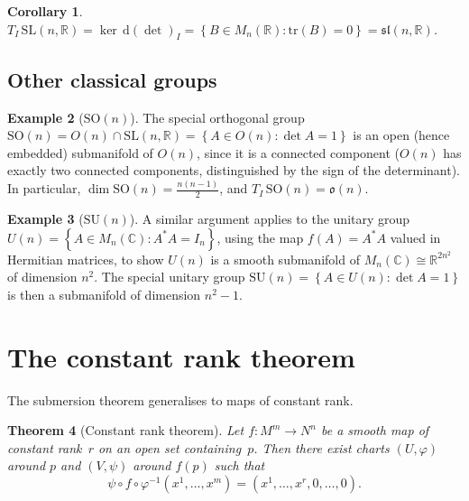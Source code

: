 \documentclass[12pt,a4paper,openany]{book}
\newtheorem{theorem}{Theorem}[section]
\newtheorem{corollary}[theorem]{Corollary}
\theoremstyle{definition}
\newtheorem{example}[theorem]{Example}
\theoremstyle{remark}
\newcommand{\R}{\mathbb{R}}
\newcommand{\C}{\mathbb{C}}
\newcommand{\SL}{\mathrm{SL}}
\newcommand{\SO}{\mathrm{SO}}
\newcommand{\SU}{\mathrm{SU}}
\newcommand{\dd}{\,\mathrm{d}}
\newcommand{\set}[1]{\left\{ #1 \right\}}
\begin{document}
\begin{corollary}\label{cor:tangent-SLn}%
$T_I\,\SL(n, \R) = \ker \dd(\det)_I
= \set{B \in M_n(\R) : \mathrm{tr}(B) = 0}
= \mathfrak{sl}(n, \R)$\index{$\mathfrak{sl}(n, \R)$}.
\end{corollary}

\subsection{Other classical groups}\label{ssec:classical-groups}

\begin{example}[$\SO(n)$]\label{ex:SOn}%
\index{$\SO(n)$}
The special orthogonal group
$\SO(n) = O(n) \cap \SL(n, \R) = \set{A \in O(n) : \det A = 1}$ is an
open (hence embedded) submanifold of $O(n)$, since it is a connected
component ($O(n)$ has exactly two connected components, distinguished
by the sign of the determinant).  In particular,
$\dim \SO(n) = \frac{n(n-1)}{2}$, and $T_I\,\SO(n) = \mathfrak{o}(n)$.
\end{example}

\begin{example}[$\SU(n)$]\label{ex:SUn}%
\index{$\SU(n)$}
A similar argument applies to the unitary group
$U(n) = \set{A \in M_n(\C) : A^*A = I_n}$, using the map
$f(A) = A^*A$ valued in Hermitian matrices, to show $U(n)$ is a smooth
submanifold of $M_n(\C) \cong \R^{2n^2}$ of dimension $n^2$.  The
special unitary group $\SU(n) = \set{A \in U(n) : \det A = 1}$ is
then a submanifold of dimension $n^2 - 1$.
\end{example}

\section{The constant rank theorem}\label{sec:constant-rank}

The submersion theorem generalises to maps of constant rank.

\begin{theorem}[Constant rank theorem]\label{thm:constant-rank}%
Let $f \colon M^m \to N^n$ be a smooth map of constant rank~$r$ on an
open set containing~$p$.  Then there exist charts $(U, \varphi)$ around
$p$ and $(V, \psi)$ around $f(p)$ such that
\[
  \psi \circ f \circ \varphi^{-1}(x^1, \dots, x^m)
  = (x^1, \dots, x^r, 0, \dots, 0).
\]
\end{theorem}
\end{document}
